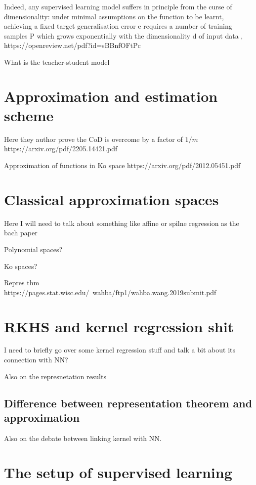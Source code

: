 Indeed, any supervised learning model suffers in principle from the curse of
dimensionality: under minimal assumptions on the function to be learnt,
achieving a fixed target generalisation error e requires a number of training
samples P which grows exponentially with the dimensionality d of input data ,
 https://openreview.net/pdf?id=sBBnfOFtPc

What is the teacher-student model

\section{Approximation and estimation scheme}

Here they author prove the CoD is overcome by a factor of $1/m$
https://arxiv.org/pdf/2205.14421.pdf

Approximation of functions in Ko space https://arxiv.org/pdf/2012.05451.pdf

\section{Classical approximation spaces}

Here I will need to talk about something like affine or spilne regression as the
bach paper

Polynomial spaces?

Ko spaces?

Repres thm https://pages.stat.wisc.edu/~wahba/ftp1/wahba.wang.2019submit.pdf

\section{RKHS and kernel regression shit}

I need to briefly go over some kernel regression stuff and talk a bit about its
connection with NN?

Also on the represnetation results

\subsection{Difference between representation theorem and approximation}

Also on the debate between linking kernel with NN.


\section{The setup of supervised learning}

